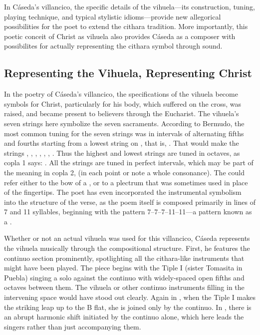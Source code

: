 
In Cáseda's villancico, the specific details of the vihuela---its construction,
tuning, playing technique, and typical stylistic idioms---provide new
allegorical possibilities for the poet to extend the cithara tradition.
More importantly, this poetic conceit of Christ as vihuela also provides Cáseda
as a composer with possibilites for actually representing the cithara symbol
through sound.

\subsection{Representing the Vihuela, Representing Christ}

In the poetry of Cáseda's villancico, the specifications of the vihuela become
symbols for Christ, particularly for his body, which suffered on the cross, was
raised, and became present to believers through the Eucharist.
The vihuela's seven strings here symbolize the seven sacraments.
According to Bermudo, the most common tuning for the seven strings was in
intervals of alternating fifths and fourths starting from a lowest string on 
, that is, .%
    \Autocite[109r--109v]{Bermudo:Declaracion}
That would make the strings , , ,
, , , .
Thus the highest and lowest strings are tuned in octaves, as copla 1 says:
.
All the strings are tuned in perfect intervals, which may be part of the
meaning in copla 2,  (in each point or
note a whole consonance).
The  could refer either to the bow of a , or
to a plectrum that was sometimes used in place of the fingertips.
The poet has even incorporated the instrumental symbolism into the structure of
the verse, as the poem itself is composed primarily in lines of 7 and 11
syllables, beginning with the pattern 7--7--7--11--11---a pattern known as a
.%
    \Autocite{Lauer:Metrification}


Whether or not an actual vihuela was used for this villancico, Cáseda
represents the vihuela musically through the compositional structure.
First, he features the continuo section prominently, spotlighting all the
cithara-like instruments that might have been played.
The piece begins with the Tiple I (sister Tomasita in Puebla) singing a solo
against the continuo with widely-spaced open fifths and octaves between them.
The vihuela or other continuo instruments filling in the intervening space
would have stood out clearly.
Again in , when the Tiple I makes the striking leap up to the
B flat, she is joined only by the continuo.
In , there is an abrupt harmonic shift initiated by the continuo
alone, which here leads the singers rather than just accompanying them.

